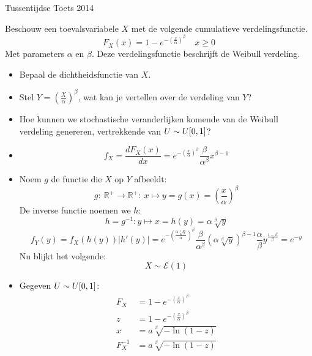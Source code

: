 \documentclass[main.tex]{subfiles}
\begin{document}
\begin{examenvraag}{Tussentijdse Toets 2014}
  \begin{ex-vraag}
    Beschouw een toevalsvariabele $X$ met de volgende cumulatieve verdelingsfunctie.
    \[ F_{X}(x) = 1 - e^{-\left(\frac{x}{\alpha}\right)^{\beta}} \quad x \ge 0 \]
    Met parameters $\alpha$ en $\beta$.
    Deze verdelingsfunctie beschrijft de Weibull verdeling.
    \begin{itemize}
    \item Bepaal de dichtheidsfunctie van $X$.
    \item Stel $Y = \left(\frac{X}{\alpha}\right)^{\beta}$, wat kan je vertellen over de verdeling van $Y$?
    \item Hoe kunnen we stochastische veranderlijken komende van de Weibull verdeling genereren, vertrekkende van $U \sim U\interval{0}{1}$? 
    \end{itemize}
  \end{ex-vraag}
  \begin{ex-antwoord}
    \begin{itemize}
    \item
      \[ f_{X} = \frac{dF_{X}(x)}{dx} = e^{-\left(\frac{x}{\alpha}\right)^{\beta}}\frac{\beta}{\alpha^{\beta}}x^{\beta-1} \]
      \needed
    \item 
      Noem $g$ de functie die $X$ op $Y$ afbeeldt:
      \[ g:\ \mathbb{R}^{+} \rightarrow \mathbb{R}^{+}:\ x \mapsto y = g(x) = \left(\frac{x}{\alpha}\right)^{\beta} \]
      De inverse functie noemen we $h$:
      \[ h = g^{-1}: y \mapsto x = h(y) = \alpha\sqrt[\beta]{y} \]
      \[ f_{Y}(y) = f_{X}(h(y))|h'(y)| = e^{-\left(\frac{\alpha\sqrt[\beta]{y}}{\alpha}\right)^{\beta}}\frac{\beta}{\alpha^{\beta}}\left(\alpha\sqrt[\beta]{y}\right)^{\beta-1} \frac{\alpha}{\beta}y^{\frac{1-\beta}{\beta}} = e^{-y} \]
      Nu blijkt het volgende:
      \[ X \sim \mathcal{E}(1) \]
    \item Gegeven $U \sim U\interval{0}{1}$:
      \[
      \begin{array}{rl}
        F_{X} &= 1 - e^{-\left(\frac{x}{\alpha}\right)^{\beta}}\\
        z &= 1 - e^{-\left(\frac{x}{\alpha}\right)^{\beta}}\\
        x &= a\sqrt[\beta]{-\ln(1-z)}\\
        F_{X}^{-1} &= a\sqrt[\beta]{-\ln(1-z)}\\
      \end{array}
      \]
    \end{itemize}
  \end{ex-antwoord}
\end{examenvraag}
\end{document}
